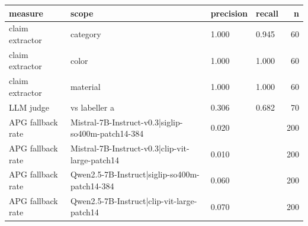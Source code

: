 \begin{tabular}{llllr}
\toprule
measure & scope & precision & recall & n \\
\midrule
claim extractor & category & 1.000 & 0.945 & 60 \\
claim extractor & color & 1.000 & 1.000 & 60 \\
claim extractor & material & 1.000 & 1.000 & 60 \\
LLM judge & vs labeller a & 0.306 & 0.682 & 70 \\
APG fallback rate & Mistral-7B-Instruct-v0.3|siglip-so400m-patch14-384 & 0.020 &  & 200 \\
APG fallback rate & Mistral-7B-Instruct-v0.3|clip-vit-large-patch14 & 0.010 &  & 200 \\
APG fallback rate & Qwen2.5-7B-Instruct|siglip-so400m-patch14-384 & 0.060 &  & 200 \\
APG fallback rate & Qwen2.5-7B-Instruct|clip-vit-large-patch14 & 0.070 &  & 200 \\
\bottomrule
\end{tabular}
